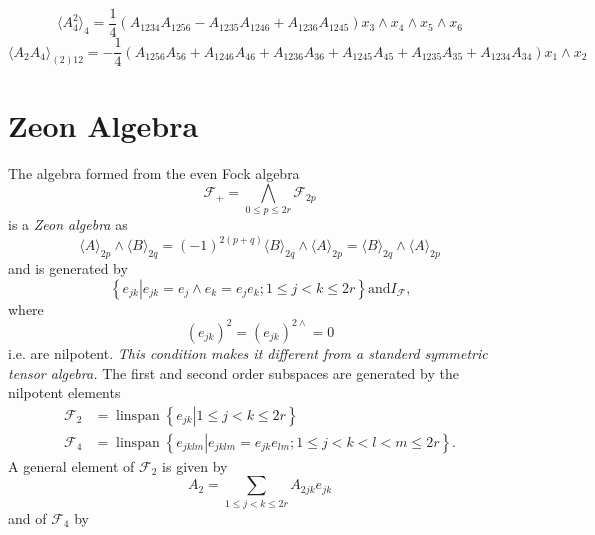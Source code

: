 \documentclass[aps, preprint]{revtex4}
\begin{document}
\begin{equation} \langle A_{4}^{2} \rangle _{4} =\frac{1}{4} \left (A_{1 2 3 4} A_{1 2 5 6} -A_{1 2 3 5} A_{1 2 4 6} +A_{1 2 3 6} A_{1 2 4 5}\right ) x_{3} \wedge x_{4} \wedge x_{5} \wedge x_{6}
\end{equation}
\begin{equation} \langle A_{2} A_{4} \rangle _{\left (2\right ) 12} = -\frac{1}{4} \left (A_{1 2 5 6} A_{5 6} +A_{1 2 4 6} A_{4 6} +A_{1 2 3 6} A_{3 6} +A_{1 2 4 5} A_{4 5} +A_{1 2 3 5} A_{3 5} +A_{1 2 3 4} A_{3 4}\right ) x_{1} \wedge x_{2}
\end{equation}

\section{Zeon Algebra}
\qquad The algebra formed from the even Fock algebra
\begin{equation}\mathcal{F}_{ +} ={\displaystyle\bigwedge _{0 \leq p \leq 2 r}}\mathcal{F}_{2 p}
\end{equation}is a \emph{Zeon algebra} as
\begin{equation} \langle A \rangle _{2 p} \wedge  \langle B \rangle _{2 q} =( -1)^{2 \left (p +q\right )}  \langle B \rangle _{2 q} \wedge  \langle A \rangle _{2 p} = \langle B \rangle _{2 q} \wedge  \langle A \rangle _{2 p}
\end{equation}and is generated by
\begin{equation}\left \{\left .e_{j k}\right \vert e_{j k} =e_{j} \wedge e_{k} =e_{j} e_{k} ;1 \leq j <k \leq 2 r\right \}\text{and}I_{\mathcal{F}}\text{,}
\end{equation}where
\begin{equation}\left (e_{j k}\right )^{2} =\left (e_{j k}\right )^{2 \wedge } =0
\end{equation}i.e. are nilpotent. \emph{This condition makes it different from a standerd symmetric tensor algebra. }The
first and second order subspaces are generated by the nilpotent elements
\begin{align}\mathcal{F}_{2} &  =\ensuremath{\operatorname*{linspan}}\left \{\left .e_{j k}\right \vert 1 \leq j <k \leq 2 r\right \} \\
\mathcal{F}_{4} &  =\ensuremath{\operatorname*{linspan}}\left \{\left .e_{j k l m}\right \vert e_{j k l m} =e_{j k} e_{l m} ;1 \leq j <k <l <m \leq 2 r\right \}\text{.}\end{align}A general element of $\mathcal{F}_{2}$ is given by
\begin{equation}A_{2} ={\displaystyle\sum _{1 \leq j <k \leq 2 r}}A_{2 j k} e_{j k}
\end{equation}and of $\mathcal{F}_{4}$ by
\end{document}
